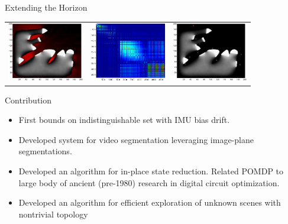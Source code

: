 \begin{tframe}{Extending the Horizon}
\begin{center}

\bigskip
\begin{tabular}{ccc}
\includegraphics[width=1.3in]{media_exploration/extra/marg}&
\includegraphics[width=1.3in]{media_exploration/extra/sim_matrix}&
\includegraphics[width=1.3in]{media_exploration/extra/10samples}
\end{tabular}
\end{center}
\end{tframe}

\begin{tframe}{Contribution}
 \begin{itemize}
  \item First bounds on indistinguishable set with IMU bias drift.
  \item Developed system for video segmentation leveraging image-plane segmentations.
  \item Developed an algorithm for in-place state reduction. Related POMDP to large body of ancient (pre-1980) research in digital circuit optimization.
  \item Developed an algorithm for efficient exploration of unknown scenes with nontrivial topology
 \end{itemize}
\end{tframe}
